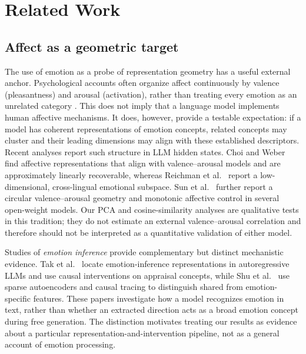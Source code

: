\section{Related Work}

\subsection{Affect as a geometric target}

The use of emotion as a probe of representation geometry has a useful external
anchor.  Psychological accounts often organize affect continuously by valence
(pleasantness) and arousal (activation), rather than treating every emotion as
an unrelated category \cite{russell_circumplex_1980,posner_circumplex_2005}.
This does not imply that a language model implements human affective
mechanisms.  It does, however, provide a testable expectation: if a model has
coherent representations of emotion concepts, related concepts may cluster and
their leading dimensions may align with these established descriptors.
Recent analyses report such structure in LLM hidden states.  Choi and Weber
\cite{choi_latent_2026} find affective representations that align with
valence--arousal models and are approximately linearly recoverable, whereas
Reichman et al.\ \cite{reichman_emotions_2026} report a low-dimensional,
cross-lingual emotional subspace.  Sun et al.\ \cite{sun_valence-arousal_2026}
further report a circular valence--arousal geometry and monotonic affective
control in several open-weight models.  Our PCA and cosine-similarity analyses
are qualitative tests in this tradition; they do not estimate an external
valence--arousal correlation and therefore should not be interpreted as a
quantitative validation of either model.

Studies of \emph{emotion inference} provide complementary but distinct
mechanistic evidence.  Tak et al.\ \cite{tak_emotion_inference_2025} locate
emotion-inference representations in autoregressive LLMs and use causal
interventions on appraisal concepts, while Shu et al.\ \cite{shu_syntax_emotion_2026}
use sparse autoencoders and causal tracing to distinguish shared from
emotion-specific features.  These papers investigate how a model recognizes
emotion in text, rather than whether an extracted direction acts as a broad
emotion concept during free generation.  The distinction motivates treating
our results as evidence about a particular representation-and-intervention
pipeline, not as a general account of emotion processing.

